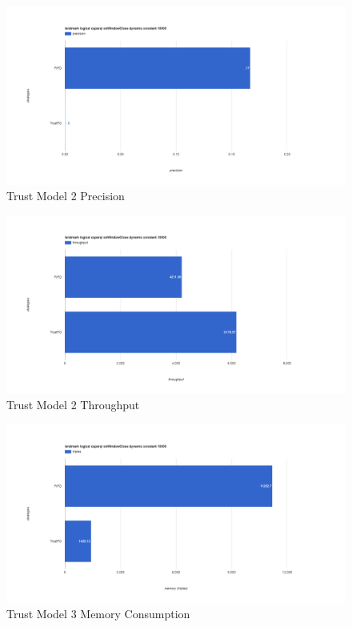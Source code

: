 \begin{figure}[!htbp]
	\centering
    \includegraphics[width=6.5in]{img/app3-trust-2-p.png}
    \caption{Trust Model 2 Precision}
\end{figure}
\begin{figure}[!htbp]
	\centering
    \includegraphics[width=6.5in]{img/app3-trust-2-t.png}
    \caption{Trust Model 2 Throughput}
\end{figure}
\begin{figure}[!htbp]
	\centering
    \includegraphics[width=6.5in]{img/app3-trust-3-m.png}
    \caption{Trust Model 3 Memory Consumption}
\end{figure}
